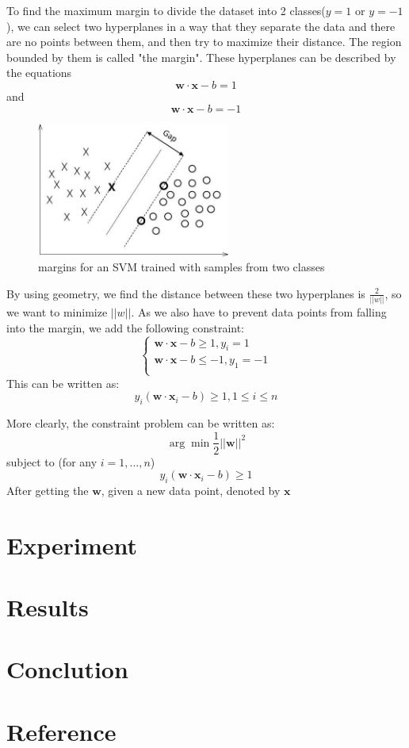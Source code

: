 \documentclass{vldb}
\begin{document}
\par  To find the maximum margin to divide the dataset into 2 classes($y=1$ or $y=-1$), we can select two hyperplanes in a way that they separate the data and there are no points between them, and then try to maximize their distance. The region bounded by them is called "the margin". These hyperplanes can be described by the equations
\begin{displaymath}
\mathbf{w}\cdot\mathbf{x}-b=1
\end{displaymath}
and
\begin{displaymath}
\mathbf{w}\cdot\mathbf{x}-b=-1
\end{displaymath}
\begin{figure}
\begin{center}
\includegraphics[width=2.50in]{SVM.jpeg}
\caption{margins for an SVM trained with samples from two classes}
\end{center}
\end{figure}
\par By using geometry, we find the distance between these two hyperplanes is $\frac{2}{||w||}$, so we want to minimize $||w||$. As we also have to prevent data points from falling into the margin, we add the following constraint:
\begin{displaymath}
\begin{cases}
\mathbf{w}\cdot\mathbf{x}-b\ge1,y_i=1\\
\mathbf{w}\cdot\mathbf{x}-b\le-1,y_1=-1\\
\end{cases}
\end{displaymath}
This can be written as:
\begin{displaymath}
y_i(\mathbf{w}\cdot\mathbf{x}_i-b)\ge1,1\le i \le n
\end{displaymath}
\par More clearly, the constraint problem can be written as:
\begin{displaymath}
\arg\min\frac{1}{2}||\mathbf{w}||^2
\end{displaymath}
subject to (for any $i = 1,...,n$)
\begin{displaymath}
y_i(\mathbf{w}\cdot\mathbf{x}_i-b)\ge1
\end{displaymath}
After getting the $\mathbf{w}$, given a new data point, denoted by $\mathbf{x}$
\section{Experiment}
\section{Results}
\section{Conclution}
\section{Reference}
\end{document}
